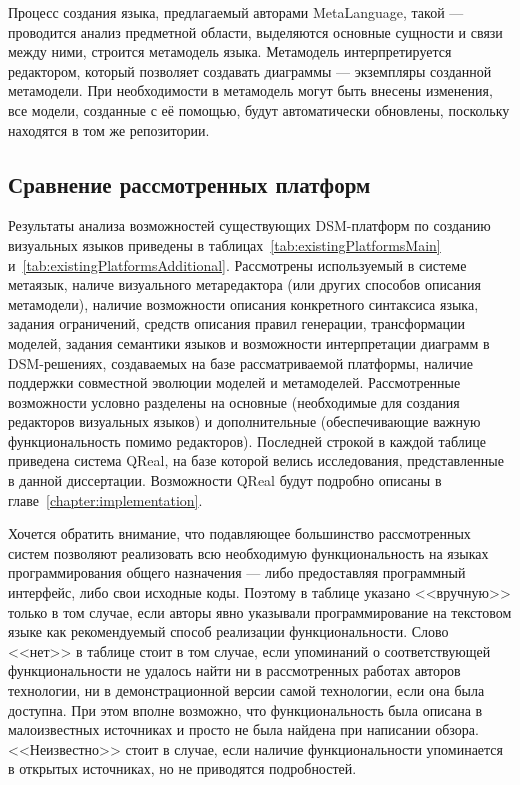 Процесс создания языка, предлагаемый авторами MetaLanguage, такой --- проводится анализ 
предметной области, выделяются основные сущности и связи между ними, строится метамодель языка.
Метамодель интерпретируется редактором, который позволяет создавать диаграммы --- экземпляры
созданной метамодели. При необходимости в метамодель могут быть внесены изменения, все 
модели, созданные с её помощью, будут автоматически обновлены, поскольку находятся в том же репозитории.

\subsection{Сравнение рассмотренных платформ}
Результаты анализа возможностей существующих \ac{DSM}-платформ по созданию визуальных 
языков приведены в таблицах~\ref{tab:existingPlatformsMain} и~\ref{tab:existingPlatformsAdditional}.
Рассмотрены используемый в системе метаязык, наличе визуального метаредактора (или других способов описания метамодели),
наличие возможности описания конкретного синтаксиса языка, задания ограничений, средств описания
правил генерации, трансформации моделей, задания семантики языков и возможности интерпретации
диаграмм в \ac{DSM}-решениях, создаваемых на базе рассматриваемой платформы, наличие поддержки совместной
эволюции моделей и метамоделей. Рассмотренные возможности условно разделены на основные 
(необходимые для создания редакторов визуальных языков) и дополнительные (обеспечивающие
важную функциональность помимо редакторов). Последней строкой в каждой таблице приведена 
система QReal, на базе которой велись исследования, представленные в данной диссертации.
Возможности QReal будут подробно описаны в главе~\ref{chapter:implementation}.

Хочется обратить внимание, что подавляющее большинство рассмотренных систем позволяют реализовать
всю необходимую функциональность на языках программирования общего назначения --- либо 
предоставляя программный интерфейс, либо свои исходные коды. Поэтому в таблице указано
<<вручную>> только в том случае, если авторы явно указывали программирование на текстовом языке
как рекомендуемый способ реализации функциональности. Слово <<нет>> в таблице стоит в том
случае, если упоминаний о соответствующей функциональности не удалось найти ни в рассмотренных 
работах авторов технологии, ни в демонстрационной версии самой технологии, если она была доступна.
При этом вполне возможно, что функциональность была описана в малоизвестных источниках и просто
не была найдена при написании обзора. <<Неизвестно>> стоит в случае, если наличие функциональности
упоминается в открытых источниках, но не приводятся подробностей.


